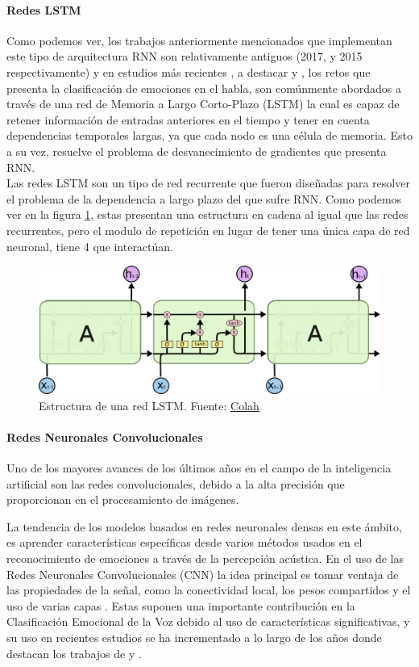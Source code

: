 \documentclass[11pt,a4paper,spanish]{book}
\begin{document}
	\paragraph{Redes LSTM}\hfill \break
	Como podemos ver, los trabajos anteriormente mencionados que implementan este tipo de arquitectura RNN son relativamente antiguos (2017, y 2015 respectivamente) y en estudios más recientes , a destacar \cite{Wang2020} y \cite{Atmaja2019}, los retos que presenta la clasificación de emociones en el habla, son comúnmente abordados a través de una red de Memoria a Largo Corto-Plazo (LSTM) la cual es capaz de retener información de entradas anteriores en el tiempo y tener en cuenta dependencias temporales largas, ya que cada nodo es una célula de memoria. Esto a su vez, resuelve el problema de desvanecimiento de gradientes que presenta RNN.\\
	Las redes LSTM son un tipo de red recurrente que fueron diseñadas para resolver el problema de la dependencia a largo plazo del que sufre RNN. Como podemos ver en la figura \ref{fig:netLSTM}, estas presentan una estructura en cadena al igual que las redes recurrentes, pero el modulo de repetición en lugar de tener una única capa de red neuronal, tiene 4 que interactúan.
	\begin{figure}[H]
		\centering
		\includegraphics[scale=0.25]{LSTM3-chain.png}
		\caption{Estructura de una red LSTM. Fuente: \href{https://colah.github.io/posts/2015-08-Understanding-LSTMs/}{Colah}}
		\label{fig:netLSTM} 
	\end{figure}
	
	\paragraph{Redes Neuronales Convolucionales}\hfill \break
	Uno de los mayores avances de los últimos años en el campo de la inteligencia artificial son las redes convolucionales, debido a la alta precisión que proporcionan en el procesamiento de imágenes.
	
	La tendencia de los modelos basados en redes neuronales densas en este ámbito, es aprender características específicas desde varios métodos usados en el reconocimiento de emociones a través de la percepción acústica. En el uso de las Redes Neuronales Convolucionales (CNN) la idea principal es tomar ventaja de las propiedades de la señal, como la conectividad local, los pesos compartidos y el uso de varias capas  \cite{Lim2017}. Estas suponen una importante contribución en la Clasificación Emocional de la Voz debido al uso de características significativas, y su uso en recientes estudios se ha incrementado a lo largo de los años donde destacan los trabajos de \cite{AbdulQayyum2019} y \cite{Anvarjon2020}.  %
	
\end{document}
